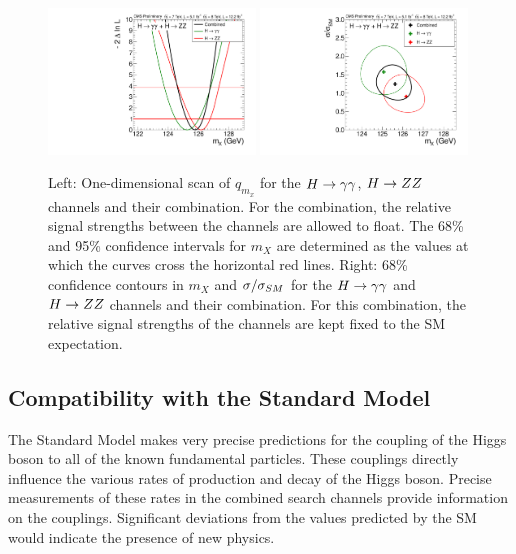 \begin{figure}
\includegraphics[width=0.49\textwidth]{combinations/Figure_007-b.pdf}
\includegraphics[width=0.49\textwidth]{combinations/Figure_007-a.pdf}
\caption{ Left: One-dimensional scan of $q_{m_{x}}$ for the $H\rightarrow\gamma\gamma$,
$H\rightarrow ZZ$ channels and their combination. For the combination, the relative
signal strengths between the channels are allowed to float. The 68\%
and 95\% confidence intervals for $m_{X}$ are determined as the values at
which the curves cross the horizontal red lines. Right: 68\% confidence
contours in $m_{X}$ and $\sigma/\sigma_{SM}$ for the $H\rightarrow\gamma\gamma$ and $H\rightarrow ZZ$ channels and their
combination. For this combination, the relative signal strengths of the 
channels are kept fixed to the SM expectation.}
\label{fig:mass}
\end{figure}
\subsection{Compatibility with the Standard Model}
The Standard Model makes very precise predictions for the coupling of the Higgs 
boson to all of the known fundamental particles. These couplings directly influence 
the various rates of production and decay of the Higgs boson. 
Precise measurements of these rates 
in the combined search channels provide information on the couplings. 
Significant deviations from the values predicted by the SM 
would indicate the presence of new physics.

